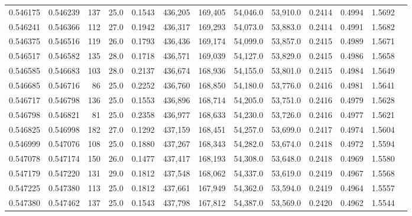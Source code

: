 \begin{tabular}{rrrrrrrrrrrrr}
0.546175 & 0.546239 &   137 & 25.0 &                                     0.1543 & 436,205 & 169,405 &  54,046.0 &  53,910.0 & 0.2414 & 0.4994 & 1.5692 \\
0.546241 & 0.546366 &   112 & 27.0 &                                     0.1942 & 436,317 & 169,293 &  54,073.0 &  53,883.0 & 0.2414 & 0.4991 & 1.5682 \\
0.546375 & 0.546516 &   119 & 26.0 &                                     0.1793 & 436,436 & 169,174 &  54,099.0 &  53,857.0 & 0.2415 & 0.4989 & 1.5671 \\
0.546517 & 0.546582 &   135 & 28.0 &                                     0.1718 & 436,571 & 169,039 &  54,127.0 &  53,829.0 & 0.2415 & 0.4986 & 1.5658 \\
0.546585 & 0.546683 &   103 & 28.0 &                                     0.2137 & 436,674 & 168,936 &  54,155.0 &  53,801.0 & 0.2415 & 0.4984 & 1.5649 \\
0.546685 & 0.546716 &    86 & 25.0 &                                     0.2252 & 436,760 & 168,850 &  54,180.0 &  53,776.0 & 0.2416 & 0.4981 & 1.5641 \\
0.546717 & 0.546798 &   136 & 25.0 &                                     0.1553 & 436,896 & 168,714 &  54,205.0 &  53,751.0 & 0.2416 & 0.4979 & 1.5628 \\
0.546798 & 0.546821 &    81 & 25.0 &                                     0.2358 & 436,977 & 168,633 &  54,230.0 &  53,726.0 & 0.2416 & 0.4977 & 1.5621 \\
0.546825 & 0.546998 &   182 & 27.0 &                                     0.1292 & 437,159 & 168,451 &  54,257.0 &  53,699.0 & 0.2417 & 0.4974 & 1.5604 \\
0.546999 & 0.547076 &   108 & 25.0 &                                     0.1880 & 437,267 & 168,343 &  54,282.0 &  53,674.0 & 0.2418 & 0.4972 & 1.5594 \\
0.547078 & 0.547174 &   150 & 26.0 &                                     0.1477 & 437,417 & 168,193 &  54,308.0 &  53,648.0 & 0.2418 & 0.4969 & 1.5580 \\
0.547179 & 0.547220 &   131 & 29.0 &                                     0.1812 & 437,548 & 168,062 &  54,337.0 &  53,619.0 & 0.2419 & 0.4967 & 1.5568 \\
0.547225 & 0.547380 &   113 & 25.0 &                                     0.1812 & 437,661 & 167,949 &  54,362.0 &  53,594.0 & 0.2419 & 0.4964 & 1.5557 \\
0.547380 & 0.547462 &   137 & 25.0 &                                     0.1543 & 437,798 & 167,812 &  54,387.0 &  53,569.0 & 0.2420 & 0.4962 & 1.5544 \\

\end{tabular}

